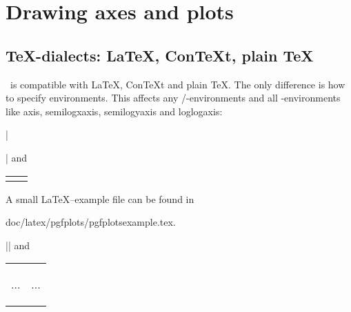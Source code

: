 
\section{Drawing axes and plots}
\subsection{\TeX-dialects: \LaTeX, Con{\TeX}t, plain \TeX }
\label{sec:tex:dialects}%
\PGFPlots\ is compatible with \LaTeX, Con{\TeX}t and plain \TeX. The only difference is how to specify environments. This affects any \PGF/\Tikz-environments and all \PGFPlots-environments like axis, semilogxaxis, semilogyaxis and loglogaxis:
\begin{description}
\def\HEAD{%
	\small
	\begin{tabular}{*{2}{p{4cm}}}%
}%
\item[\LaTeX:] |\usepackage{pgfplots}| and

{\HEAD
\begin{codeexample}
\begin{tikzpicture}
\begin{axis}
...
\end{axis}
\end{tikzpicture}
\end{codeexample}
&
\begin{codeexample}
\begin{tikzpicture}
\begin{semilogxaxis}
...
\end{semilogxaxis}
\end{tikzpicture}
\end{codeexample}
\\
\end{tabular}%
}

A small \LaTeX--example file can be found in
\begin{codeexample}
doc/latex/pgfplots/pgfplotsexample.tex.
\end{codeexample}

\item[Con{\TeX}t:] |\usemodule[pgfplots]| and

{\HEAD
\begin{codeexample}
\starttikzpicture
\startaxis
...
\stopaxis
\stoptikzpicture
\end{codeexample}
&
\begin{codeexample}
\starttikzpicture
\startsemilogxaxis
...
\stopsemilogxaxis
\stoptikzpicture
\end{codeexample}
\\
\end{tabular}%
}


\end{description}
